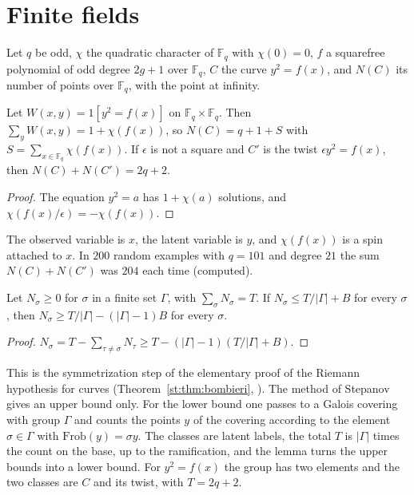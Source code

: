 \section{Finite fields}\label{lvz:sec:ff}

Let $q$ be odd, $\chi$ the quadratic character of $\mathbb F_q$ with $\chi(0)=0$, $f$ a squarefree polynomial of odd degree $2g+1$ over $\mathbb F_q$, $C$ the curve $y^2=f(x)$, and $N(C)$ its number of points over $\mathbb F_q$, with the point at infinity.

\begin{proposition}\label{lvz:prop:augment}
Let $W(x,y)=1[y^2=f(x)]$ on $\mathbb F_q\times\mathbb F_q$. Then $\sum_yW(x,y)=1+\chi(f(x))$, so $N(C)=q+1+S$ with $S=\sum_{x\in\mathbb F_q}\chi(f(x))$. If $\epsilon$ is not a square and $C'$ is the twist $\epsilon y^2=f(x)$, then $N(C)+N(C')=2q+2$.
\end{proposition}

\begin{proof}
The equation $y^2=a$ has $1+\chi(a)$ solutions, and $\chi(f(x)/\epsilon)=-\chi(f(x))$.
\end{proof}

The observed variable is $x$, the latent variable is $y$, and $\chi(f(x))$ is a spin attached to $x$. In $200$ random examples with $q=101$ and degree $21$ the sum $N(C)+N(C')$ was $204$ each time (computed).

\begin{lemma}\label{lvz:lem:classes}
Let $N_\sigma\ge0$ for $\sigma$ in a finite set $\Gamma$, with $\sum_\sigma N_\sigma=T$. If $N_\sigma\le T/|\Gamma|+B$ for every $\sigma$, then $N_\sigma\ge T/|\Gamma|-(|\Gamma|-1)B$ for every $\sigma$.
\end{lemma}

\begin{proof}
$N_\sigma=T-\sum_{\tau\ne\sigma}N_\tau\ge T-(|\Gamma|-1)(T/|\Gamma|+B)$.
\end{proof}

This is the symmetrization step of the elementary proof of the Riemann hypothesis for curves (Theorem~\ref{st:thm:bombieri}, \cite{BombieriStepanov}). The method of Stepanov gives an upper bound only. For the lower bound one passes to a Galois covering with group $\Gamma$ and counts the points $y$ of the covering according to the element $\sigma\in\Gamma$ with $\mathrm{Frob}(y)=\sigma y$. The classes are latent labels, the total $T$ is $|\Gamma|$ times the count on the base, up to the ramification, and the lemma turns the upper bounds into a lower bound. For $y^2=f(x)$ the group has two elements and the two classes are $C$ and its twist, with $T=2q+2$.

